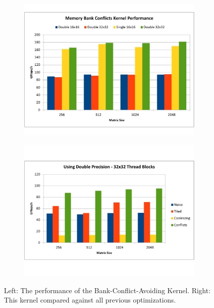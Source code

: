 \documentclass[paper=a4, fontsize=11pt]{scrartcl} %
\numberwithin{equation}{section} %
\numberwithin{figure}{section} %
\numberwithin{table}{section} %
\begin{document}
\begin{figure} [h]
\centering
\begin{subfigure}{.5\textwidth}
  \centering
  \includegraphics[width=.97\linewidth]{figures/conflicts.pdf}
  \label{fig:conflicts}
\end{subfigure}%
\begin{subfigure}{.5\textwidth}
  \centering
  \includegraphics[width=1.03\linewidth]{figures/conflicts_vs_coalescing.pdf}
  \label{fig:conflicts_vs_coalesced}
\end{subfigure}
\caption{Left: The performance of the Bank-Conflict-Avoiding Kernel. Right: This kernel compared against all previous optimizations.}
\label{fig:multi5}
\end{figure}
\end{document}
